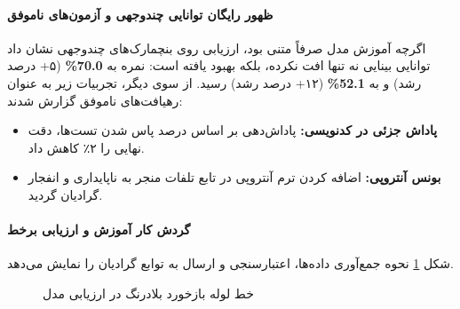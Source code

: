 \paragraph*{ظهور رایگان توانایی چندوجهی و آزمون‌های ناموفق}
اگرچه آموزش مدل صرفاً متنی بود، ارزیابی روی بنچمارک‌های چندوجهی نشان داد توانایی بینایی نه تنها افت نکرده، بلکه بهبود یافته است: نمره  به \textbf{70.0\%} (۵+ درصد رشد) و   به \textbf{52.1\%} (۱۲+ درصد رشد) رسید.
از سوی دیگر، تجربیات زیر به عنوان رهیافت‌های ناموفق گزارش شدند:
\begin{itemize}
    \item \textbf{پاداش جزئی در کدنویسی:} پاداش‌دهی بر اساس درصد پاس شدن تست‌ها، دقت نهایی  را ۲٪ کاهش داد.
    \item \textbf{بونس آنتروپی:} اضافه کردن ترم آنتروپی در تابع تلفات منجر به ناپایداری و انفجار گرادیان گردید.
\end{itemize}

\paragraph*{گردش کار آموزش و ارزیابی  برخط}
شکل \ref{fig:magistral_eval_flow} نحوه جمع‌آوری داده‌ها، اعتبارسنجی و ارسال به توابع گرادیان را نمایش می‌دهد.

\begin{figure}[htbp]
\centering
{}
\caption{خط لوله بازخورد بلادرنگ در ارزیابی مدل }
\label{fig:magistral_eval_flow}
\end{figure}
